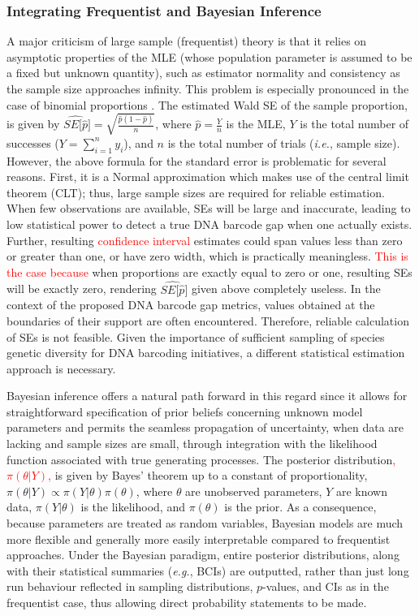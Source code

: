 \documentclass[12pt]{article}
\begin{document}
\subsubsection{Integrating Frequentist and Bayesian Inference}

A major criticism of large sample (frequentist) theory is that it relies on asymptotic properties of the MLE (whose population parameter is assumed to be a fixed but unknown quantity), such as estimator normality and consistency as the sample size approaches infinity. This problem is especially pronounced in the case of binomial proportions \citep{newcombe1998confidence}. The estimated Wald SE of the sample proportion, is given by $\widehat{SE[\hat{p}}] = \sqrt{\frac{\hat{p}(1 - \hat{p})}{n}}$, where $\hat{p} = \frac{Y}{n}$ is the MLE, $Y$ is the total number of successes ($Y = \sum_{i=1}^n{y_i}$), and $n$ is the total number of trials (\textit{i.e.}, sample size). However, the above formula for the standard error is problematic for several reasons. First, it is a Normal approximation which makes use of the central limit theorem (CLT); thus, large sample sizes are required for reliable estimation. When few observations are available, SEs will be large and inaccurate, leading to low statistical power to detect a true DNA barcode gap when one actually exists. Further, resulting \textcolor{red}{confidence interval} estimates could span values less than zero or greater than one, or have zero width, which is practically meaningless. \textcolor{red}{This is the case because} when proportions are exactly equal to zero or one, resulting SEs will be exactly zero, rendering $\widehat{SE[\hat{p}}]$ given above completely useless. In the context of the proposed DNA barcode gap metrics, values obtained at the boundaries of their support are often encountered. Therefore, reliable calculation of SEs is not feasible. Given the importance of sufficient sampling of species genetic diversity for DNA barcoding initiatives, a different statistical estimation approach is necessary. 

Bayesian inference offers a natural path forward in this regard since it allows for \\ straightforward specification of prior beliefs concerning unknown model parameters and permits the seamless propagation of uncertainty, when data are lacking and sample sizes are small, through integration with the likelihood function associated with true generating processes. The posterior distribution\textcolor{red}{, $\pi(\theta | Y)$,} is given by Bayes' theorem up to a constant of proportionality, $\pi(\theta | Y) \propto \pi(Y | \theta)\pi(\theta)$, where $\theta$ are unobserved parameters, $Y$ are known data, $\pi(Y | \theta)$ is the likelihood, and $\pi(\theta)$ is the prior.  As a consequence, because parameters are treated as random variables, Bayesian models are much more flexible and generally more easily interpretable compared to frequentist approaches. Under the Bayesian paradigm, entire posterior distributions, along with their statistical summaries (\textit{e.g.}, BCIs) are outputted, rather than just long run behaviour reflected in sampling distributions, $p$-values, and CIs as in the frequentist case, thus allowing direct probability statements to be made. 
\end{document}
